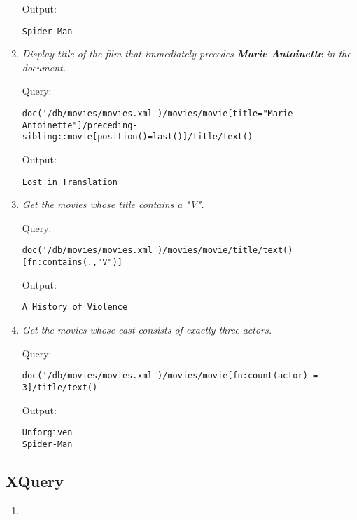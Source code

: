 \documentclass[a4paper, notitlepage]{article}
\begin{document}
\begin{enumerate}
Output:
  
\begin{lstlisting}
Spider-Man
\end{lstlisting} 

\item 
  \emph{Display title of the film that immediately precedes \textbf{Marie Antoinette} in the document.} 
  
Query: 
  
\begin{lstlisting}
doc('/db/movies/movies.xml')/movies/movie[title="Marie Antoinette"]/preceding-sibling::movie[position()=last()]/title/text()
\end{lstlisting}
  
Output:
  
\begin{lstlisting}
Lost in Translation
\end{lstlisting}   

\item 
  \emph{Get the movies whose title contains a "V".} 
  
Query: 
  
\begin{lstlisting}
doc('/db/movies/movies.xml')/movies/movie/title/text()[fn:contains(.,"V")]
\end{lstlisting}
  
Output:
  
\begin{lstlisting}
A History of Violence
\end{lstlisting}   

\item 
  \emph{Get the movies whose cast consists of exactly three actors.} 
  
Query: 
  
\begin{lstlisting}
doc('/db/movies/movies.xml')/movies/movie[fn:count(actor) = 3]/title/text()
\end{lstlisting}
  
Output:
  
\begin{lstlisting}
Unforgiven
Spider-Man
\end{lstlisting}   
  
\end{enumerate}


\subsection{XQuery}

\begin{enumerate}
\item  
\end{enumerate}
\end{document}
